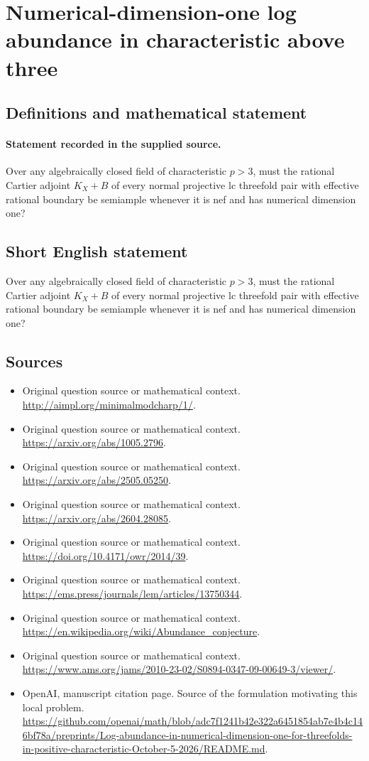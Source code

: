 \documentclass[11pt]{article}
\begin{document}
\section*{Numerical-dimension-one log abundance in characteristic above three}\label{statement}
\subsection{Definitions and mathematical statement}
\paragraph{Statement recorded in the supplied source.}
Over any algebraically closed field of characteristic $p>3$, must the rational Cartier adjoint $K_X+B$ of every normal projective lc threefold pair with effective rational boundary be semiample whenever it is nef and has numerical dimension one?
\subsection{Short English statement}
Over any algebraically closed field of characteristic $p>3$, must the rational Cartier adjoint $K_X+B$ of every normal projective lc threefold pair with effective rational boundary be semiample whenever it is nef and has numerical dimension one?
\subsection{Sources}
\begin{itemize}
\item[S1] Original question source or mathematical context.
\url{http://aimpl.org/minimalmodcharp/1/}.
\item[S2] Original question source or mathematical context.
\url{https://arxiv.org/abs/1005.2796}.
\item[S3] Original question source or mathematical context.
\url{https://arxiv.org/abs/2505.05250}.
\item[S4] Original question source or mathematical context.
\url{https://arxiv.org/abs/2604.28085}.
\item[S5] Original question source or mathematical context.
\url{https://doi.org/10.4171/owr/2014/39}.
\item[S6] Original question source or mathematical context.
\url{https://ems.press/journals/lem/articles/13750344}.
\item[S7] Original question source or mathematical context.
\url{https://en.wikipedia.org/wiki/Abundance_conjecture}.
\item[S8] Original question source or mathematical context.
\url{https://www.ams.org/jams/2010-23-02/S0894-0347-09-00649-3/viewer/}.
\item[S9] OpenAI, manuscript citation page. Source of the formulation motivating this local problem.
\url{https://github.com/openai/math/blob/adc7f1241b42e322a6451854ab7e4b4c146bf78a/preprints/Log-abundance-in-numerical-dimension-one-for-threefolds-in-positive-characteristic-October-5-2026/README.md}.
\end{itemize}
\end{document}
